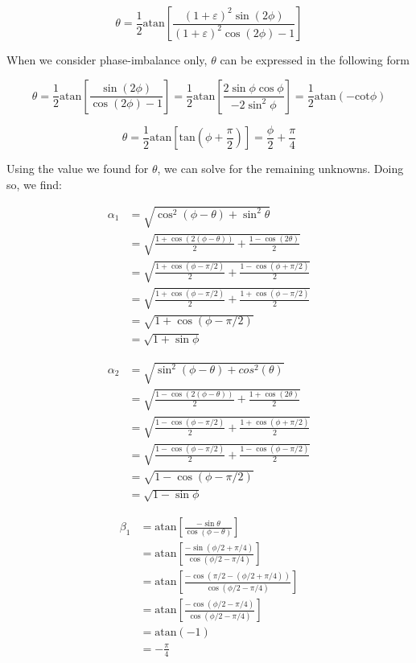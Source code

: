 \documentclass{article}
\begin{document}
\begin{equation}
	\theta = \frac{1}{2}\text{atan}\left[\frac{(1+\varepsilon)^2\sin(2\phi)}{(1+\varepsilon)^2\cos(2\phi)-1}\right]
\end{equation}

When we consider phase-imbalance only, $\theta$ can be expressed in the following form

\begin{equation}
	\theta = \frac{1}{2}\text{atan}\left[\frac{\sin(2\phi)}{\cos(2\phi)-1}\right] = \frac{1}{2}\text{atan}\left[\frac{2\sin\phi\cos\phi}{-2\sin^2\phi}\right] = \frac{1}{2}\text{atan}(-\text{cot}\phi)
\end{equation}

\begin{equation}
	\theta = \frac{1}{2}\text{atan}\left[\text{tan}\left(\phi+\frac{\pi}{2}\right)\right] = \frac{\phi}{2}+\frac{\pi}{4}
\end{equation}

Using the value we found for $\theta$, we can solve for the remaining unknowns. Doing so, we find:

\begin{align}
	\alpha_1 &= \sqrt{\cos^2(\phi-\theta)+\sin^2\theta} \\
	&= \sqrt{\frac{1+\cos(2(\phi-\theta))}{2}+\frac{1-\cos(2\theta)}{2}} \\
	&= \sqrt{\frac{1+\cos(\phi-\pi/2)}{2}+\frac{1-\cos(\phi+\pi/2)}{2}} \\
	&= \sqrt{\frac{1+\cos(\phi-\pi/2)}{2}+\frac{1+\cos(\phi-\pi/2)}{2}} \\
	&= \sqrt{1+\cos(\phi-\pi/2)} \\
	&= \sqrt{1+\sin\phi}
\end{align}

\begin{align}
	\alpha_2 &= \sqrt{\sin^2(\phi-\theta)+cos^2(\theta)} \\
	&= \sqrt{\frac{1-\cos(2(\phi-\theta))}{2}+\frac{1+\cos(2\theta)}{2}} \\
	&= \sqrt{\frac{1-\cos(\phi-\pi/2)}{2}+\frac{1+\cos(\phi+\pi/2)}{2}} \\
	&= \sqrt{\frac{1-\cos(\phi-\pi/2)}{2}+\frac{1-\cos(\phi-\pi/2)}{2}} \\
	&= \sqrt{1-\cos(\phi-\pi/2)} \\
	&= \sqrt{1-\sin\phi}
\end{align}

\begin{align}
	\beta_1 &= \text{atan}\left[\frac{-\sin\theta}{\cos(\phi-\theta)}\right] \\
	&= \text{atan}\left[\frac{-\sin(\phi/2+\pi/4)}{\cos(\phi/2-\pi/4)}\right] \\
	&= \text{atan}\left[\frac{-\cos(\pi/2-(\phi/2+\pi/4))}{\cos(\phi/2-\pi/4)}\right] \\
	&= \text{atan}\left[\frac{-\cos(\phi/2-\pi/4)}{\cos(\phi/2-\pi/4)}\right] \\
	&= \text{atan}(-1) \\
	&= -\frac{\pi}{4}
\end{align}
\end{document}
